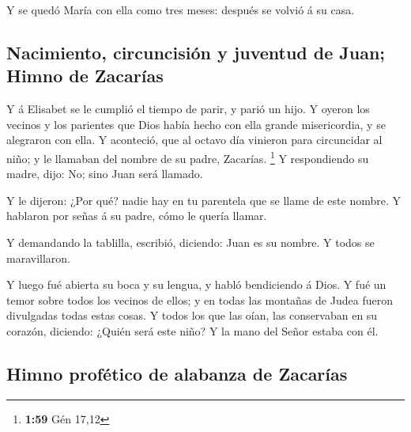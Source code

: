  Y se quedó María con ella como tres meses: después se
volvió á su casa.

\hypertarget{nacimiento-circuncisiuxf3n-y-juventud-de-juan-himno-de-zacaruxedas}{%
\subsection{Nacimiento, circuncisión y juventud de Juan; Himno de
Zacarías}\label{nacimiento-circuncisiuxf3n-y-juventud-de-juan-himno-de-zacaruxedas}}

 Y á Elisabet se le cumplió el tiempo de parir, y parió
un hijo.  Y oyeron los vecinos y los parientes que Dios
había hecho con ella grande misericordia, y se alegraron con ella.
 Y aconteció, que al octavo día vinieron para circuncidar
al niño; y le llamaban del nombre de su padre, Zacarías. \footnote{\textbf{1:59}
  Gén 17,12}  Y respondiendo su madre, dijo: No; sino
Juan será llamado.

 Y le dijeron: ¿Por qué? nadie hay en tu parentela que se
llame de este nombre.  Y hablaron por señas á su padre,
cómo le quería llamar.

 Y demandando la tablilla, escribió, diciendo: Juan es su
nombre. Y todos se maravillaron.

 Y luego fué abierta su boca y su lengua, y habló
bendiciendo á Dios.  Y fué un temor sobre todos los
vecinos de ellos; y en todas las montañas de Judea fueron divulgadas
todas estas cosas.  Y todos los que las oían, las
conservaban en su corazón, diciendo: ¿Quién será este niño? Y la mano
del Señor estaba con él.

\hypertarget{himno-profuxe9tico-de-alabanza-de-zacaruxedas}{%
\subsection{Himno profético de alabanza de
Zacarías}\label{himno-profuxe9tico-de-alabanza-de-zacaruxedas}}

